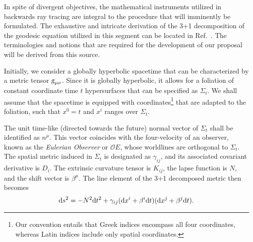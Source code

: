 In spite of divergent objectives, the mathematical instruments utilized in backwards ray tracing are integral to the procedure that will imminently be formulated. The exhaustive and intricate derivation of the 3+1 decomposition of the geodesic equation utilized in this segment can be located in Ref.~\cite{Vincent_2012}. The terminologies and notions that are required for the development of our proposal will be derived from this source. 

Initially, we consider a globally hyperbolic spacetime that can be characterized by a metric tensor $\mtrtens{\mu}{\nu}$. Since it is globally hyperbolic, it allows for a foliation of constant coordinate time $t$ hypersurfaces that can be specified as $\Sigma_t$. We shall assume that the spacetime is equipped with coordinates\footnote{Our convention entails that Greek indices encompass all four coordinates, whereas Latin indices include only spatial coordinates.} that are adapted to the foliation, such that $x^0=t$ and $x^i$ ranges over $\Sigma_t$.

The unit time-like (directed towards the future) normal vector of $\Sigma_t$ shall be identified as $n^\mu$. This vector coincides with the four-velocity of an observer, known as the \emph{Eulerian Observer} or $\mathcal{O}E$, whose worldlines are orthogonal to $\Sigma_t$. The spatial metric induced in $\Sigma_t$ is designated as $\gamma_{ij}$, and its associated covariant derivative is $D_i$. The extrinsic curvature tensor is $K_{ij}$, the lapse function is $N$, and the shift vector is $\beta^\mu$. The line element of the 3+1 decomposed metric then becomes
%
\begin{equation}
  \mathrm{d} s^2 = -N^2 \mathrm{d} t^2 + \gamma_{ij}(\mathrm{d} x^i + \beta^i \mathrm{d} t)(\mathrm{d} x^j + \beta^j \mathrm{d} t).
  \label{eq:arbitrary_penrose_decomposed_metric}
\end{equation}

